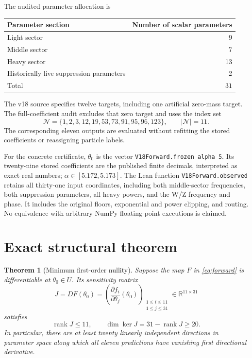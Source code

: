 \documentclass[11pt]{article}
\newtheorem{theorem}{Theorem}[section]
\newcommand{\R}{\mathbb{R}}
\newcommand{\rank}{\operatorname{rank}}
\newcommand{\Null}{\operatorname{ker}}
\begin{document}
The audited parameter allocation is
\begin{center}
\begin{tabular}{lr}
\toprule
Parameter section & Number of scalar parameters\\
\midrule
Light sector & 9\\
Middle sector & 7\\
Heavy sector & 13\\
Historically live suppression parameters & 2\\
\midrule
Total & \(31\)\\
\bottomrule
\end{tabular}
\end{center}
The v18 source specifies twelve targets, including one artificial
zero-mass target. The full-coefficient audit excludes that zero target and
uses the index set
\begin{equation}
  \mathcal N=\{1,2,3,12,19,53,73,91,95,96,123\},
  \qquad |\mathcal N|=11.
  \label{eq:indices}
\end{equation}
The corresponding eleven outputs are evaluated without refitting the
stored coefficients or reassigning particle labels.

For the concrete certificate, $\theta_0$ is the vector
\texttt{V18Forward.frozen alpha 5}. Its twenty-nine stored coefficients
are the published finite decimals, interpreted as exact real numbers;
$\alpha\in[5.172,5.173]$. The Lean function \texttt{V18Forward.observed}
retains all thirty-one input coordinates, including both middle-sector
frequencies, both suppression parameters, all heavy powers, and the W/Z
frequency and phase. It includes the original floors, exponential and
power clipping, and routing. No equivalence with arbitrary NumPy
floating-point executions is claimed.


\section{Exact structural theorem}

\begin{theorem}[Minimum first-order nullity]
\label{thm:structural}
Suppose the map \(F\) in \eqref{eq:forward} is differentiable at
\(\theta_0\in U\). Its sensitivity matrix
\begin{equation}
  J=DF(\theta_0)
   =\left(\frac{\partial f_i}{\partial\theta_j}(\theta_0)\right)_
          {\substack{1\leq i\leq11\\1\leq j\leq31}}
   \in\R^{11\times31}
  \label{eq:jacobian}
\end{equation}
satisfies
\begin{equation}
  \boxed{\rank J\leq11},
  \qquad
  \boxed{\dim\Null J=31-\rank J\geq20}.
  \label{eq:main}
\end{equation}
In particular, there are at least twenty linearly independent directions
in parameter space along which all eleven predictions have vanishing
first directional derivative.
\end{theorem}
\end{document}
